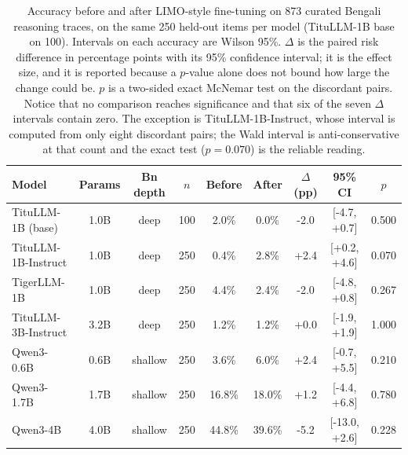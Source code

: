 \begin{table}[t]
\caption{Accuracy before and after LIMO-style fine-tuning on 873 curated
Bengali reasoning traces, on the same 250 held-out items per model
(TituLLM-1B base on 100). Intervals on each accuracy are Wilson 95\%.
$\Delta$ is the paired risk difference in percentage points with its 95\%
confidence interval; it is the effect size, and it is reported because a
$p$-value alone does not bound how large the change could be. $p$ is a
two-sided exact McNemar test on the discordant pairs. Notice that no
comparison reaches significance and that six of the seven $\Delta$
intervals contain zero. The exception is TituLLM-1B-Instruct, whose
interval is computed from only eight discordant pairs; the Wald interval
is anti-conservative at that count and the exact test ($p=0.070$) is the
reliable reading.}
\label{tab:main}
\centering\small
\begin{tabular}{|l|c|c|c|c|c|c|c|c|}
\hline
\textbf{Model} & \textbf{Params} & \textbf{Bn depth} & \textbf{$n$} & \textbf{Before} & \textbf{After} & \textbf{$\Delta$ (pp)} & \textbf{95\% CI} & \textbf{$p$} \\
\hline
TituLLM-1B (base) & 1.0B & deep & 100 & 2.0\% & 0.0\% & -2.0 & [-4.7, +0.7] & 0.500 \\
TituLLM-1B-Instruct & 1.0B & deep & 250 & 0.4\% & 2.8\% & +2.4 & [+0.2, +4.6] & 0.070 \\
TigerLLM-1B & 1.0B & deep & 250 & 4.4\% & 2.4\% & -2.0 & [-4.8, +0.8] & 0.267 \\
TituLLM-3B-Instruct & 3.2B & deep & 250 & 1.2\% & 1.2\% & +0.0 & [-1.9, +1.9] & 1.000 \\
Qwen3-0.6B & 0.6B & shallow & 250 & 3.6\% & 6.0\% & +2.4 & [-0.7, +5.5] & 0.210 \\
Qwen3-1.7B & 1.7B & shallow & 250 & 16.8\% & 18.0\% & +1.2 & [-4.4, +6.8] & 0.780 \\
Qwen3-4B & 4.0B & shallow & 250 & 44.8\% & 39.6\% & -5.2 & [-13.0, +2.6] & 0.228 \\
\hline
\end{tabular}
\end{table}